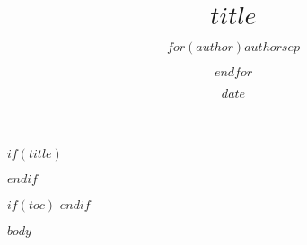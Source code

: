 \documentclass[$if(fontsize)$$fontsize$,$endif$$if(lang)$$lang$,$endif$,openany,oneside,a4paper]{$documentclass$}
\title{$title$}
\author{$for(author)$$author$$sep$ \and $endfor$}
\date{$date$}
\begin{document}
$if(title)$
\maketitle
$endif$

\newpage

$if(toc)$
{
\setcounter{tocdepth}{$toc-depth$}
\tableofcontents
}
$endif$

$body$
\end{document}
